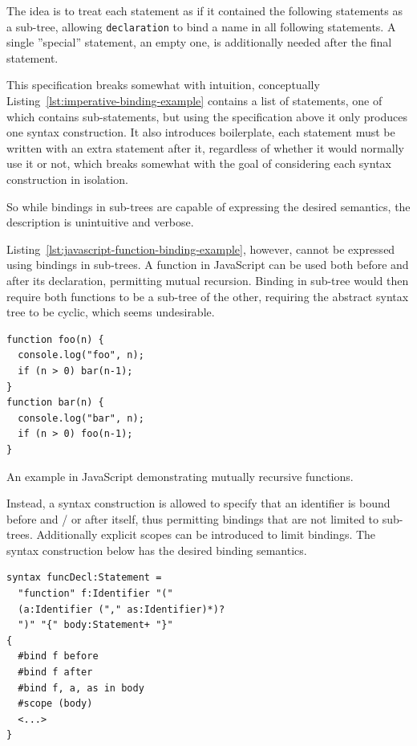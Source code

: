 \documentclass{kththesis}
\begin{document}
The idea is to treat each statement as if it contained the following statements as a sub-tree, allowing \texttt{declaration} to bind a name in all following statements. A single ''special'' statement, an empty one, is additionally needed after the final statement.

This specification breaks somewhat with intuition, conceptually Listing~\ref{lst:imperative-binding-example} contains a list of statements, one of which contains sub-statements, but using the specification above it only produces one syntax construction. It also introduces boilerplate, each statement must be written with an extra statement after it, regardless of whether it would normally use it or not, which breaks somewhat with the goal of considering each syntax construction in isolation.

So while bindings in sub-trees are capable of expressing the desired semantics, the description is unintuitive and verbose.

Listing~\ref{lst:javascript-function-binding-example}, however, cannot be expressed using bindings in sub-trees. A function in JavaScript can be used both before and after its declaration, permitting mutual recursion. Binding in sub-tree would then require both functions to be a sub-tree of the other, requiring the abstract syntax tree to be cyclic, which seems undesirable.

\begin{listing}
\begin{verbatim}
function foo(n) {
  console.log("foo", n);
  if (n > 0) bar(n-1);
}
function bar(n) {
  console.log("bar", n);
  if (n > 0) foo(n-1);
}
\end{verbatim}
\caption{An example in JavaScript demonstrating mutually recursive functions.}
\label{lst:javascript-function-binding-example}
\end{listing}

Instead, a syntax construction is allowed to specify that an identifier is bound before and / or after itself, thus permitting bindings that are not limited to sub-trees. Additionally explicit scopes can be introduced to limit bindings. The syntax construction below has the desired binding semantics.

\begin{verbatim}
syntax funcDecl:Statement =
  "function" f:Identifier "("
  (a:Identifier ("," as:Identifier)*)?
  ")" "{" body:Statement+ "}"
{
  #bind f before
  #bind f after
  #bind f, a, as in body
  #scope (body)
  <...>
}
\end{verbatim}
\end{document}
